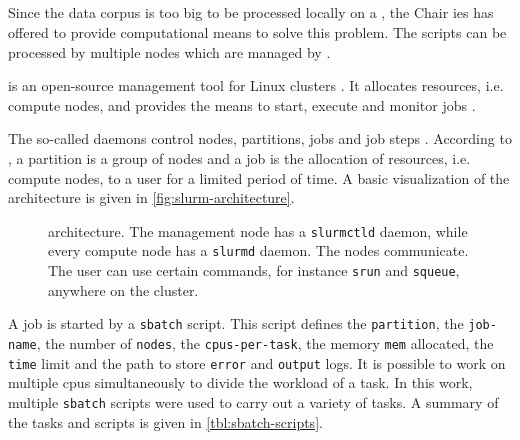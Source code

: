 
\subsection{\slurm{}}\label{subsec:slurm}

Since the data corpus is too big to be processed locally on a \localMaschineStats{}, the Chair \ac{ies} has offered to provide computational means to solve this problem.
The scripts can be processed by multiple nodes which are managed by \slurm{}.

\slurm{} is an open-source management tool for Linux clusters \cite{slurm-online}.
It allocates resources, i.e. compute nodes, and provides the means to start, execute and monitor jobs \cite{slurm-online, slurm2003}.

The so-called \slurm{} daemons control nodes, partitions, jobs and job steps \cite{slurm-online}.
According to \citeauthor{slurm-online}, a partition is a group of nodes and a job is the allocation of resources, i.e. compute nodes, to a user for a limited period of time.
A basic visualization of the architecture is given in \autoref{fig:slurm-architecture}.

\begin{figure}[htp] %
    \centering
    
    \caption[\slurm{} architecture]{\slurm{} architecture. The management node has a \texttt{slurmctld} daemon, while every compute node has a \texttt{slurmd} daemon.
    The nodes communicate.
    The user can use certain commands, for instance \texttt{srun} and \texttt{squeue}, anywhere on the cluster.
    }
    \label{fig:slurm-architecture}
\end{figure}

A job is started by a \texttt{sbatch} script.
This script defines the \texttt{partition}, the \texttt{job-name}, the number of \texttt{nodes}, the \texttt{cpus-per-task}, the memory \texttt{mem} allocated, 
the \texttt{time} limit and the path to store \texttt{error} and \texttt{output} logs.
It is possible to work on multiple \acp{cpu} simultaneously to divide the workload of a task.
In this work, multiple \texttt{sbatch} scripts were used to carry out a variety of tasks.
A summary of the tasks and scripts is given in \autoref{tbl:sbatch-scripts}.


